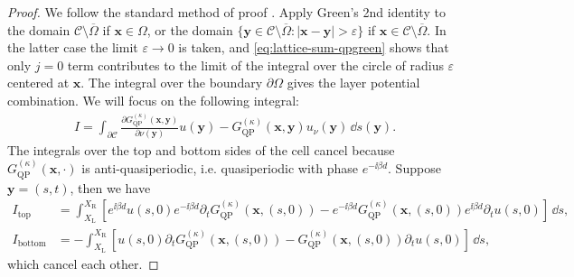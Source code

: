 \begin{proof}
We follow the standard method of proof \cite[Theorem~3.3]{ColtonKress1983}. Apply Green's 2nd identity to the domain $\mathcal{C} \setminus \overline{\Omega}$ if 
$\mathbf{x} \in \Omega$, or the domain $\{\mathbf{y} \in \mathcal{C}\setminus \overline{\Omega} : |\mathbf{x} - \mathbf{y}| > \varepsilon\}$ if $\mathbf{x} \in \mathcal{C} \setminus \overline{\Omega}$. In the latter case the limit $\varepsilon \to 0$ is taken, 
and \eqref{eq:lattice-sum-qpgreen} shows that only $j = 0$ term contributes to the limit
of the integral over the circle of radius $\varepsilon$ centered at $\mathbf{x}$. The 
integral over the boundary $\partial \Omega$ gives the layer potential combination.
We will focus on the following integral:\begin{align}
  I = \int_{\partial \mathcal{C}} \frac{\partial G^{(\kappa)}_\mathrm{QP}(\mathbf{x},\mathbf{y})}{\partial \nu(\mathbf{y})} u(\mathbf{y}) - G^{(\kappa)}_\mathrm{QP}(\mathbf{x},\mathbf{y}) u_\nu(\mathbf{y}) \, \dd s(\mathbf{y}).
\end{align}
The integrals over the top and bottom sides of the cell cancel because $G^{(\kappa)}_\mathrm{QP}(\mathbf{x}, \cdot)$ is anti-quasiperiodic, i.e. quasiperiodic with phase 
$e^{-\ii \beta d}$. Suppose $\mathbf{y} = (s,t)$, then we have \begin{align*}
  I_\mathrm{top} &= \int_{X_\mathrm{L}}^{X_\mathrm{R}} \left[e^{\ii \beta d} u(s,0) e^{-\ii \beta d}\partial_t G^{(\kappa)}_\mathrm{QP}(\mathbf{x},(s,0)) - e^{-\ii \beta d} G^{(\kappa)}_\mathrm{QP}(\mathbf{x},(s,0)) e^{\ii \beta d} \partial_t u(s,0) \right] \, \dd s,\\
  I_\mathrm{bottom} &= -\int_{X_\mathrm{L}}^{X_\mathrm{R}} \left[u(s,0) \partial_t G^{(\kappa)}_\mathrm{QP}(\mathbf{x},(s,0)) - G^{(\kappa)}_\mathrm{QP}(\mathbf{x},(s,0))\partial_t u(s,0)\right] \, \dd s,
\end{align*}
which cancel each other. 


\end{proof}
